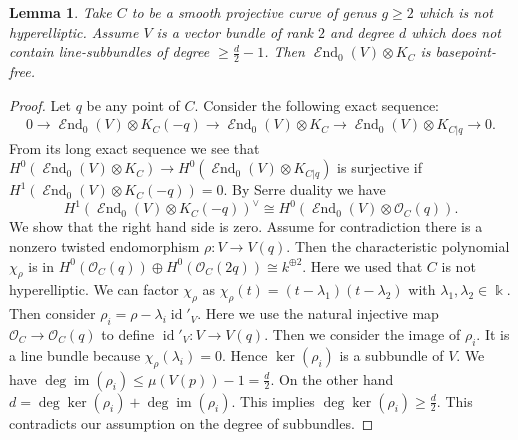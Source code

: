 \documentclass[12pt]{extarticle}
\newtheorem{lemma}[theorem]{Lemma}
\theoremstyle{definition}
\numberwithin{theorem}{section}
\newcommand{\OO}{\mathcal{O}}
\newcommand{\op}{\operatorname}
\DeclareMathOperator{\End}{\mathcal{E}nd}
\begin{document}
\begin{lemma}\label{lemma:bpf}
Take $C$ to be a smooth projective curve of genus $g \geq 2$ which is not hyperelliptic. Assume $V$ is a vector bundle of rank $2$ and degree $d$ which does not contain line-subbundles of degree $\geq \frac{d}{2}-1$. Then $\End_0(V)\otimes K_C$ is basepoint-free.
\end{lemma}
\begin{proof}
Let $q$ be any point of $C$. Consider the following exact sequence:
\begin{align*}
0 \to \End_0(V)\otimes K_C(-q) \to \End_0(V)\otimes K_C\to \End_0(V)\otimes K_{C|q} \to 0.
\end{align*}
From its long exact sequence we see that $H^0(\End_0(V)\otimes K_C)\to H^0(\End_0(V)\otimes K_{C|q})$ is surjective if $H^1(\End_0(V)\otimes K_C(-q)) = 0$. By Serre duality we have 
\begin{equation*}
H^1(\End_0(V)\otimes K_C(-q))^\vee \cong H^0(\End_0(V)\otimes \OO_C(q)).
\end{equation*}
We show that the right hand side is zero. Assume for contradiction there is a nonzero twisted endomorphism $\rho: V \to V(q)$. Then the characteristic polynomial $\chi_\rho$ is in $H^0(\OO_C(q))\oplus H^0(\OO_C(2q)) \cong k^{\oplus 2}$. Here we used that $C$ is not hyperelliptic. We can factor $\chi_\rho$ as $\chi_\rho(t) = (t-\lambda_1)(t-\lambda_2)$ with $\lambda_1,\lambda_2 \in \Bbbk$. Then consider $\rho_i = \rho - \lambda_i \op{id}'_V$. Here we use the natural injective map $\OO_C \to \OO_C(q)$ to define $\op{id}'_V: V \to V(q)$. Then we consider the image of $\rho_i$. It is a line bundle because $\chi_\rho(\lambda_i) = 0$. Hence $\ker(\rho_i)$ is a subbundle of $V$. We have $\deg \op{im}(\rho_i) \leq \mu(V(p))-1 = \frac{d}{2}$. On the other hand $d = \deg \ker(\rho_i)+\deg \op{im}(\rho_i)$. This implies $\deg \ker(\rho_i) \geq \frac{d}{2}$. This contradicts our assumption on the degree of subbundles.
\end{proof}
\end{document}

